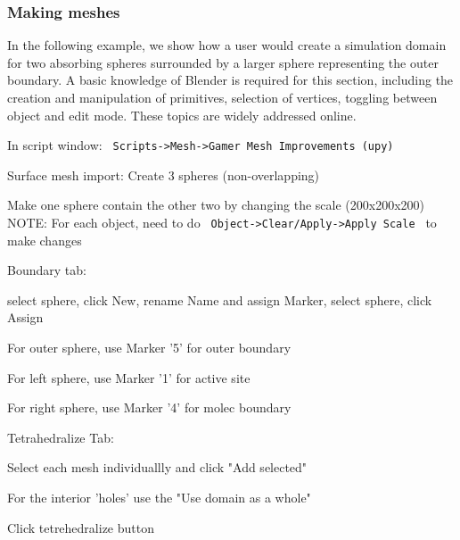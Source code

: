 \documentclass{article}
\begin{document}
\subsubsection{Making meshes}
In the following example, we show how a user would create a simulation domain for two absorbing spheres surrounded by a larger sphere representing the outer boundary. A basic knowledge of Blender is required for this section, including the creation and manipulation of primitives, selection of vertices, toggling between object and edit mode.  These topics are widely addressed online.  

In script window:
\verb! Scripts->Mesh->Gamer Mesh Improvements (upy)!

Surface mesh import: 
Create 3 spheres (non-overlapping)

Make one sphere contain the other two by changing the scale (200x200x200)
NOTE: For each object, need to do \verb! Object->Clear/Apply->Apply Scale ! to make changes

Boundary tab:
\lbi
\item select sphere, click New, rename Name and assign Marker, select sphere, click Assign
\item For outer sphere, use Marker '5' for outer boundary
\item For left sphere, use Marker '1' for active site
\item For right sphere, use Marker '4' for molec boundary      
\lei



Tetrahedralize Tab:
\lbi
\item Select each mesh individuallly and click "Add selected"
\item For the interior 'holes' use the "Use domain as a whole"
\item Click tetrehedralize button 
\lei

%

\end{document}
